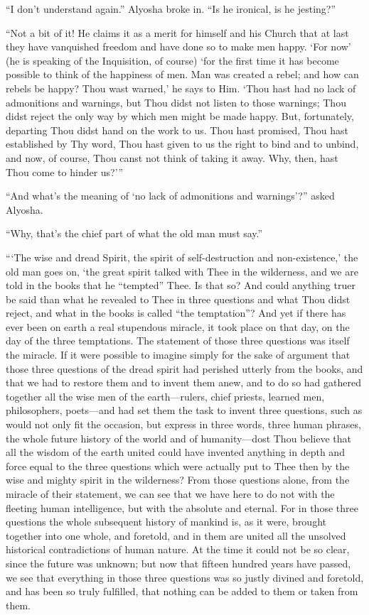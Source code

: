 ``I don't understand again.'' Alyosha broke in. ``Is he ironical, is
he jesting?''

``Not a bit of it! He claims it as a merit for himself and
his Church that at last they have vanquished freedom and have done so
to make men happy. `For now' (he is speaking of the Inquisition, of
course) `for the first time it has become possible to think of the
happiness of men. Man was created a rebel; and how can rebels be
happy? Thou wast warned,' he says to Him. `Thou hast had no lack of
admonitions and warnings, but Thou didst not listen to those warnings;
Thou didst reject the only way by which men might be made happy. But,
fortunately, departing Thou didst hand on the work to us. Thou hast
promised, Thou hast established by Thy word, Thou hast given to us the
right to bind and to unbind, and now, of course, Thou canst not think
of taking it away. Why, then, hast Thou come to hinder us?'''

``And what's the meaning of `no lack of admonitions and warnings'?''
asked Alyosha.

``Why, that's the chief part of what the old man must say.''

```The wise and dread Spirit, the spirit of self-destruction and
non-ex\-is\-tence,' the old man goes on, `the great spirit talked with
Thee in the wilderness, and we are told in the books that he
``tempted'' Thee. Is that so? And could anything truer be said than
what he revealed to Thee in three questions and what Thou didst
reject, and what in the books is called ``the temptation''? And yet if
there has ever been on earth a real stupendous miracle, it took place
on that day, on the day of the three temptations. The statement of
those three questions was itself the miracle. If it were possible to
imagine simply for the sake of argument that those three questions of
the dread spirit had perished utterly from the books, and that we had
to restore them and to invent them anew, and to do so had gathered
together all the wise men of the earth---rulers, chief priests,
learned men, philosophers, poets---and had set them the task to invent
three questions, such as would not only fit the occasion, but express
in three words, three human phrases, the whole future history of the
world and of hu\-man\-i\-ty---dost Thou believe that all the wisdom of
the earth united could have invented anything in depth and force equal
to the three questions which were actually put to Thee then by the
wise and mighty spirit in the wilderness? From those questions alone,
from the miracle of their statement, we can see that we have here to
do not with the fleeting human intelligence, but with the absolute and
eternal. For in those three questions the whole subsequent history of
mankind is, as it were, brought together into one  whole,
and foretold, and in them are united all the unsolved historical
contradictions of human nature. At the time it could not be so clear,
since the future was unknown; but now that fifteen hundred years have
passed, we see that everything in those three questions was so justly
divined and foretold, and has been so truly fulfilled, that nothing
can be added to them or taken from them.

